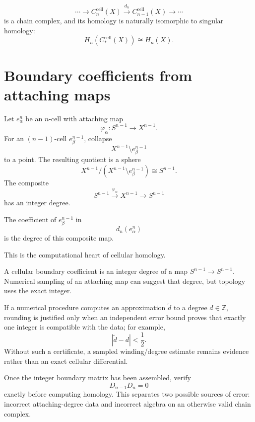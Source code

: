 \begin{theorem}
\label{thm:viii18-chain-complex}
\[
\cdots\to
C_n^{\mathrm{cell}}(X)
\xrightarrow{d_n}
C_{n-1}^{\mathrm{cell}}(X)
\to\cdots
\]
is a chain complex, and its homology is naturally isomorphic to singular
homology:
\[
H_n(C_*^{\mathrm{cell}}(X))
\cong
H_n(X).
\]
\end{theorem}

\section{Boundary coefficients from attaching maps}

Let \(e_\alpha^n\) be an \(n\)-cell with attaching map
\[
\varphi_\alpha:S^{n-1}\to X^{n-1}.
\]
For an \((n-1)\)-cell \(e_\beta^{n-1}\), collapse
\[
X^{n-1}\setminus e_\beta^{n-1}
\]
to a point.  The resulting quotient is a sphere
\[
X^{n-1}/(X^{n-1}\setminus e_\beta^{n-1})
\cong S^{n-1}.
\]
The composite
\[
S^{n-1}
\xrightarrow{\varphi_\alpha}
X^{n-1}
\longrightarrow
S^{n-1}
\]
has an integer degree.

\begin{theorem}
\label{thm:viii18-boundary-degree}
The coefficient of \(e_\beta^{n-1}\) in
\[
d_n(e_\alpha^n)
\]
is the degree of this composite map.
\end{theorem}

This is the computational heart of cellular homology.

\begin{remark}
A cellular boundary coefficient is an integer degree of a map
\(S^{n-1}\to S^{n-1}\).  Numerical sampling of an attaching map can suggest
that degree, but topology uses the exact integer.

If a numerical procedure computes an approximation \(\widetilde d\) to a
degree \(d\in\mathbb Z\), rounding is justified only when an independent error
bound proves that exactly one integer is compatible with the data; for example,
\[
|\widetilde d-d|<\frac12.
\]
Without such a certificate, a sampled winding/degree estimate remains evidence
rather than an exact cellular differential.

Once the integer boundary matrix has been assembled, verify
\[
D_{n-1}D_n=0
\]
exactly before computing homology.  This separates two possible sources of
error: incorrect attaching-degree data and incorrect algebra on an otherwise
valid chain complex.
\end{remark}

